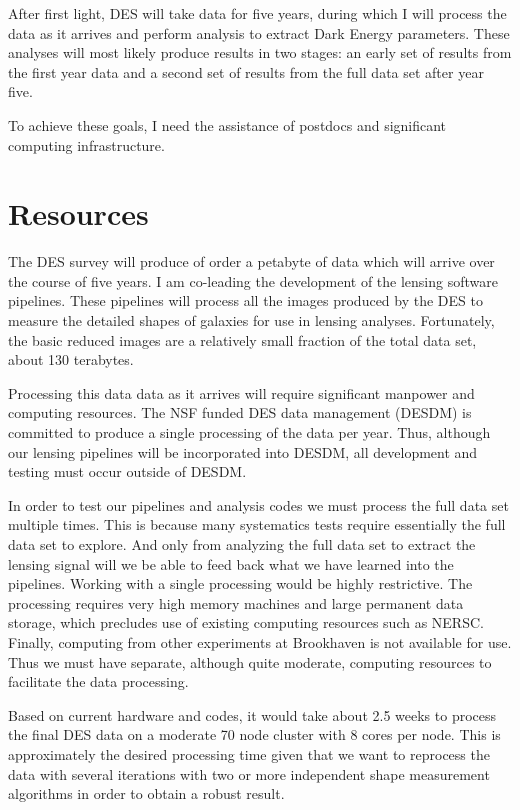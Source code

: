 \documentclass[12pt]{article}
\begin{document}
After first light, DES will take data for five years, during which I will
process the data as it arrives and perform analysis to extract Dark Energy
parameters.  These analyses will most likely produce results in two stages: an
early set of results from the first year data and a second set of results from
the full data set after year five.

To achieve these goals, I need the assistance of postdocs and significant
computing infrastructure.

\section{Resources}

The DES survey will produce of order a petabyte of data which will arrive over
the course of five years.  I am co-leading the development of the lensing
software pipelines.  These pipelines will process all the images produced by
the DES to measure the detailed shapes of galaxies for use in lensing analyses.
Fortunately, the basic reduced images are a relatively small fraction of the
total data set, about 130 terabytes.

Processing this data data as it arrives will require significant manpower and
computing resources.  The NSF funded DES data management (DESDM) is committed
to produce a single processing of the data per year.  Thus, although our
lensing pipelines will be incorporated into DESDM, all development and testing
must occur outside of DESDM.  

In order to test our pipelines and analysis codes we must process the full data
set multiple times.  This is because many systematics tests require essentially
the full data set to explore.  And only from analyzing the full data set to
extract the lensing signal will we be able to feed back what we have learned
into the pipelines.  Working with a single processing would be highly
restrictive.  The processing requires very high memory machines and large
permanent data storage, which precludes use of existing computing resources
such as NERSC. Finally, computing from other experiments at Brookhaven is not
available for use.  Thus we must have separate, although quite moderate,
computing resources to facilitate the data processing.

Based on current hardware and codes, it would take about 2.5 weeks to process
the final DES data on a moderate 70 node cluster with 8 cores per node.  This
is approximately the desired processing time given that we want to reprocess
the data with several iterations with two or more independent shape measurement
algorithms in order to obtain a robust result.
\end{document}
